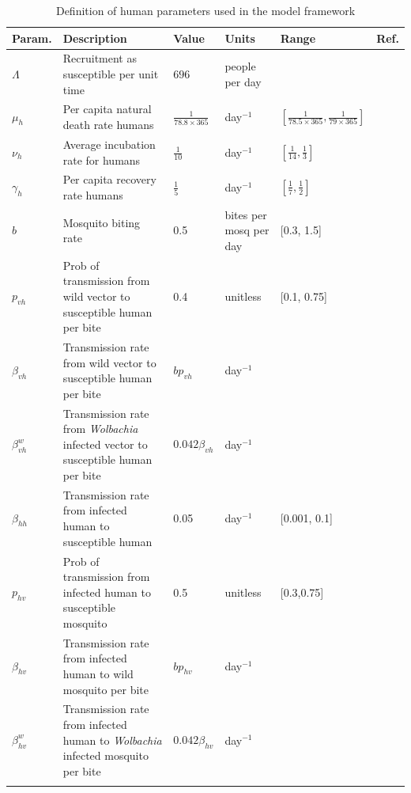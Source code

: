 \documentclass{ws-rv9x6}
\begin{document}
\begingroup
      \setlength{\tabcolsep}{0.7\tabcolsep}%
  \begin{longtable}{C{1.25cm} L{3cm} C{1.7cm} C{1.2cm} C{2.2cm} C{0.8cm}}
   \toprule
        Param. & Description & Value & Units & Range & Ref.\\
   \midrule
          $\Lambda$ & \footnotesize Recruitment as susceptible per unit time & $696$& \footnotesize people per day & &\\
  \midrule
  $\mu_h$ & \footnotesize Per capita natural death rate humans & $\frac{1}{78.8 \times 365}$ & \footnotesize day$^{-1}$ & \footnotesize $\left[\frac{1}{78.5 \times 365}, \frac{1}{79 \times 365}\right]$ & \cite{whowebsite}\\
  \midrule
$\nu_h$ & \footnotesize Average incubation rate for humans & $\frac{1}{10}$ & \footnotesize day$^{-1}$ & $\left[\frac{1}{14},\frac{1}{3}\right]$ & \cite{whowebsite}\\
\midrule
$\gamma_h$ & \footnotesize Per capita recovery rate humans & $\frac{1}{5}$ &  \footnotesize day$^{-1}$ & $\left[\frac{1}{7},\frac{1}{2}\right]$ & \cite{whowebsite}\\
\midrule
$b$ & \footnotesize Mosquito biting rate & 0.5 & \footnotesize bites per mosq per day & [0.3, 1.5] & \cite{gao2016prevention}\\
\midrule
$p_{vh}$ & \footnotesize Prob of transmission from wild vector to susceptible human per bite & 0.4 & \footnotesize unitless & [0.1, 0.75] & \cite{gao2016prevention}\\
\midrule
$\beta_{vh}$ & \footnotesize Transmission rate from wild vector to susceptible human per bite & $bp_{vh}$ & \footnotesize day$^{-1}$ & & \\ 
\midrule
$\beta^{w}_{vh}$ & \footnotesize Transmission rate from \textit{Wolbachia} infected vector to susceptible human per bite & $0.042\beta_{vh}$ & \footnotesize day$^{-1}$ & & \cite{walker2011w}\\
\midrule
$\beta_{hh}$ & \footnotesize Transmission rate from infected human to susceptible human & 0.05 &  \footnotesize day$^{-1}$& [0.001, 0.1] & \cite{gao2016prevention}\\
\midrule
$p_{hv}$ & \footnotesize Prob of transmission from infected human to susceptible mosquito & 0.5 & \footnotesize unitless & [0.3,0.75] & \cite{gao2016prevention}\\
\midrule
$\beta_{hv}$ & \footnotesize Transmission rate from infected human to wild mosquito per bite & $bp_{hv}$ & \footnotesize day$^{-1}$ & & \\
\midrule
$\beta^w_{hv}$ & \footnotesize Transmission rate from infected human to \textit{Wolbachia} infected mosquito per bite &$0.042\beta_{hv}$ & \footnotesize day$^{-1}$ & & \\
\bottomrule
 \caption{Definition of human parameters used in the model framework} 
\label{tab: param-table}
 \end{longtable}
\end{document}
